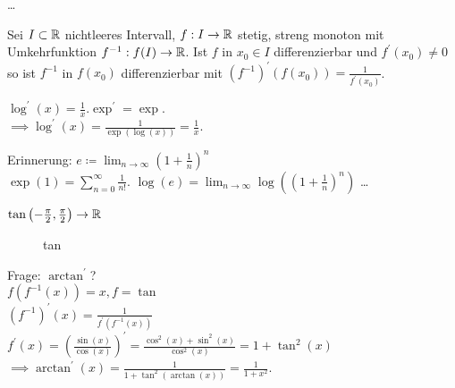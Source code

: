 \begin{subproof*}
	\ldots
\end{subproof*}

\begin{subtheorem}
	Sei $ I \subset \mathbb{R}  $ nichtleeres Intervall, $ f : I \to \mathbb{R}  $ stetig, streng monoton mit Umkehrfunktion $ f^{-1} : f(I) \to \mathbb{R}  $. Ist $ f $ in $ x_0 \in I $ differenzierbar und $ f^\prime(x_0) \neq  0 $ so ist $ f^{-1}  $ in $ f(x_0) $ differenzierbar mit $ \left( f^{-1} \right)^\prime (f(x_0)) = \frac{ 1 }{ f^\prime(x_0) }  $.
\end{subtheorem}

\begin{subexample}
	$ \log^\prime(x) = \frac{ 1 }{ x } . \exp^\prime = \exp  $.\\
	$ \implies \log^\prime(x) = \frac{ 1 }{ \exp (\log (x)) } = \frac{ 1 }{ x }  $.
\end{subexample}

\begin{subexample}
	Erinnerung: $ e \coloneqq \lim_{n \to \infty} (1 + \frac{ 1 }{ n })^n $\\
	$ \exp (1) = \sum_{n=0}^{\infty} \frac{ 1 }{ n! }  $.
	$ \log (e) = \lim_{n \to \infty} \log \left( \left( 1 + \frac{ 1 }{ n }  \right)^n \right) $ 
	\ldots
\end{subexample}

\begin{subexample}
	$ \tan \left( - \frac{ \pi }{ 2 } , \frac{ \pi }{ 2 }  \right) \to \mathbb{R}  $ 
	\begin{figure}[H]
		\centering
		\caption{tan}
		\label{plot:11.2.7}
	\end{figure}
	Frage: $ \arctan ^\prime $?\\
	$ f(f^{-1} (x)) = x, f = \tan  $\\
	$ \left( f^{-1}  \right) ^\prime(x) = \frac{ 1 }{ f^\prime\left( f^{-1} (x) \right)  }  $\\
	$ f^\prime(x) = \left( \frac{\sin (x)}{ \cos (x) }  \right) ^\prime = \frac{ \cos ^2(x) + \sin ^2(x)}{ \cos ^2(x) } = 1 + \tan ^2(x) $ 
	$ \implies \arctan ^\prime(x) = \frac{ 1 }{ 1 + \tan ^2\left( \arctan (x) \right)  } = \frac{ 1 }{ 1 + x^2 }  $.
\end{subexample}

